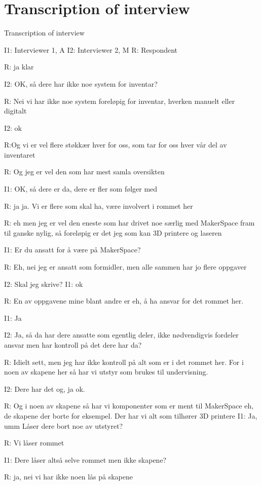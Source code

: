 \newpage
\section{Transcription of interview}

Transcription of interview

I1: Interviewer 1, A
I2: Interviewer 2, M
R: Respondent

R: ja klar

I2: OK, så dere har ikke noe system for inventar?

R: Nei vi har ikke noe system foreløpig for inventar, hverken manuelt eller digitalt

I2: ok

R:Og vi er vel flere støkkær hver for oss, som tar for oss hver vår del av inventaret

R: Og jeg er vel den som har mest samla oversikten

I1: OK, så dere er da, dere er fler som følger med

R: ja ja. Vi er flere som skal ha, være involvert i rommet her

R: eh men jeg er vel den eneste som har drivet noe særlig med MakerSpace fram til ganske nylig, så foreløpig er det jeg som kan 3D printere og laseren 

I1: Er du ansatt for å være på MakerSpace?

R: Eh, nei jeg er ansatt som formidler, men alle sammen har jo flere oppgaver

I2: Skal jeg skrive?
I1: ok

R: En av oppgavene mine blant andre er eh, å ha ansvar for det rommet her. 

I1: Ja

I2: Ja, så da har dere ansatte som egentlig deler, ikke nødvendigvis fordeler ansvar men har kontroll på det dere har da? 

R: Idielt sett, men jeg har ikke kontroll på alt som er i det rommet her. For i noen av skapene her så har vi utstyr som brukes til undervisning.  

I2: Dere har det og, ja ok.

R: Og i noen av skapene så har vi komponenter som er ment til MakerSpace eh, de skapene der borte for eksempel. Der har vi alt som tilhører 3D printere 
I1: Ja, umm Låser dere bort noe av utstyret? 

R: Vi låser rommet

I1: Dere låser altså selve rommet men ikke skapene?

R: ja, nei vi har  ikke noen lås på skapene

